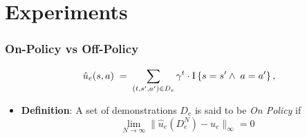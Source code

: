 \documentclass{beamer}
\begin{document}
\section*{Experiments}

\begin{frame}
	\frametitle{On-Policy vs Off-Policy}
	\begin{equation*} \label{eq:definition_u_hat}
	\hat{u}_e(s,a)
	\;=\; \sum_{(t, s',a') \in D_e} \gamma^t \cdot  \operatorname{\rm I}\left\{ s=s' \wedge\; a=a' \right\},
	\end{equation*}
	\vfill
	\begin{itemize}
		\item \textbf{Definition}: A set of demonstrations $D_e$ is said to be \emph{On Policy} if $$\lim_{N \to \infty} \| \hat{u}_e(D_e^N) - u_e \|_\infty  = 0$$
	\end{itemize}
\end{frame}
\end{document}
